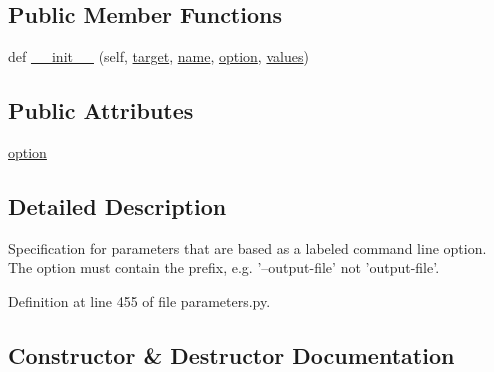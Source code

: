 \subsection*{Public Member Functions}
\begin{DoxyCompactItemize}
\item 
def \hyperlink{classcodar_1_1cheetah_1_1parameters_1_1_param_cmd_line_option_a7bf4c15694189c9570d3eb3d3b30b7f2}{\+\_\+\+\_\+init\+\_\+\+\_\+} (self, \hyperlink{classcodar_1_1cheetah_1_1parameters_1_1_param_a5603d43a20cfc6447c3718406ce0669e}{target}, \hyperlink{classcodar_1_1cheetah_1_1parameters_1_1_param_ac9982d62cd18a368a3fbc26541e14209}{name}, \hyperlink{classcodar_1_1cheetah_1_1parameters_1_1_param_cmd_line_option_a75dae9b35fe11bc6833cfa0777185e20}{option}, \hyperlink{classcodar_1_1cheetah_1_1parameters_1_1_param_aefcc82658f511bddd6605e6ac6e74fbf}{values})
\end{DoxyCompactItemize}
\subsection*{Public Attributes}
\begin{DoxyCompactItemize}
\item 
\hyperlink{classcodar_1_1cheetah_1_1parameters_1_1_param_cmd_line_option_a75dae9b35fe11bc6833cfa0777185e20}{option}
\end{DoxyCompactItemize}


\subsection{Detailed Description}
\begin{DoxyVerb}Specification for parameters that are based as a labeled command line
option. The option must contain the prefix, e.g. '--output-file' not
'output-file'.\end{DoxyVerb}
 

Definition at line 455 of file parameters.\+py.



\subsection{Constructor \& Destructor Documentation}
\mbox{\label{classcodar_1_1cheetah_1_1parameters_1_1_param_cmd_line_option_a7bf4c15694189c9570d3eb3d3b30b7f2}} 
